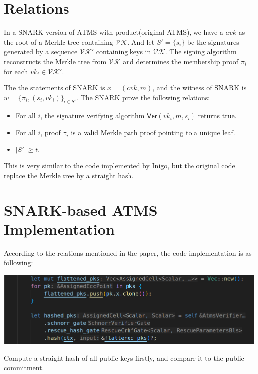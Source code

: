 \documentclass{article}
\begin{document}
\section{Relations}

In a SNARK version of ATMS with product(original ATMS), we have a $avk$ as the root of a Merkle tree containing $\mathcal{VK}$. And let $S' = \{s_i\}$ be the signatures generated by a sequence $\mathcal{VK}'$ containing keys in $\mathcal{VK}$. The signing algorithm reconstructs the Merkle tree from
$\mathcal{VK}$ and determines the membership proof $\pi_i$ for each $vk_i \in \mathcal{VK}'$. 

The the statements of SNARK is $x = (avk,m)$, and the witness of SNARK is $w = \{\pi_i, (s_i,vk_i)\}_{i \in S'}$. The SNARK prove the following relations:
\begin{itemize}
    \item For all $i$, the signature verifying algorithm $\mathsf{Ver}(vk_i,m,s_i)$ returns true.
    \item For all $i$, proof $\pi_i$ is a valid Merkle path proof pointing to a unique leaf.
    \item $|S'| \geq t$.
\end{itemize}

This is very similar to the code implemented by Inigo, but the original code replace the Merkle tree by a straight hash.


\section{SNARK-based ATMS Implementation}

According to the relations mentioned in the paper, the code implementation is as following:

\vspace{0.5cm}

\includegraphics[width=1\linewidth]{inigo_atms_code_keyhash.png}
\vspace{0.1cm}

Compute a straight hash of all public keys firstly, and compare it to the public commitment.
\end{document}
